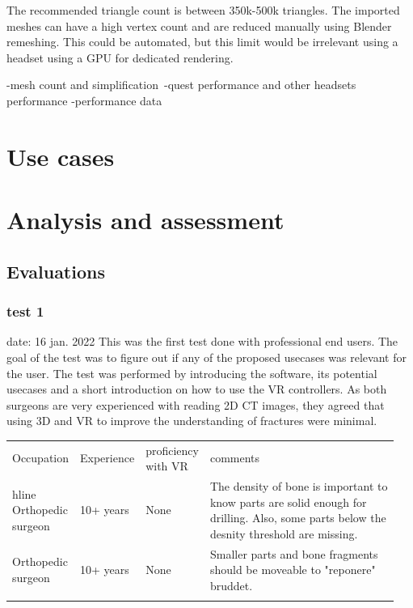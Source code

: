 \documentclass[a4paper]{report}
\begin{document}
The recommended triangle count is between 350k-500k triangles. The imported meshes can have a high vertex count and are reduced manually using Blender remeshing.
This could be automated, but this limit would be irrelevant using a headset using a GPU for dedicated rendering.


-mesh count and simplification\
-quest performance and other headsets performance
-performance data

\chapter{Use cases}\label{usecases}

\chapter{Analysis and assessment}\label{analysis and assessment}


\section{Evaluations}


\subsection{test 1}
date: 16 jan. 2022
This was the first test done with professional end users. The goal of the test was to figure out if any of the proposed usecases was relevant for the user. The test was performed by introducing the software, its potential usecases and a short introduction on how to use the VR controllers.
As both surgeons are very experienced with reading 2D CT images, they agreed that using 3D and VR to improve the understanding of fractures were minimal.

\begin{table}[ht]
\begin{tabular}{p{0.15\linewidth} |p{0.15\linewidth} |p{0.15\linewidth} | p{0.5\linewidth}}
Occupation         & Experience & proficiency with VR & comments                                                                                                                                \\hline
Orthopedic surgeon & 10+ years  & None                & The density of bone is important to know parts are solid enough for drilling. Also, some parts below the desnity threshold are missing. \\
Orthopedic surgeon & 10+ years  & None                & Smaller parts and bone fragments should be moveable to "reponere" bruddet.                                                              \\
                   &            &                     &
\end{tabular}
\end{table}
\end{document}
